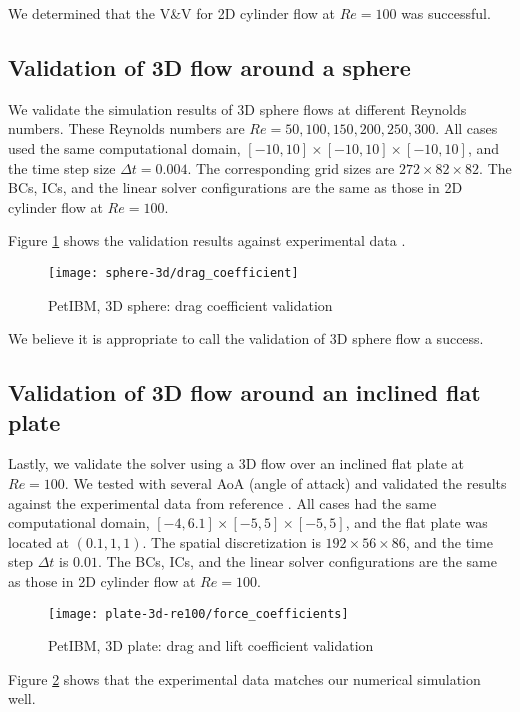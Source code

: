 We determined that the V\&V for 2D cylinder flow at $Re=100$ was successful.

\subsection*{Validation of 3D flow around a sphere}

We validate the simulation results of 3D sphere flows at different Reynolds numbers.
These Reynolds numbers are $Re=50, 100, 150, 200, 250, 300$.
All cases used the same computational domain, $[-10, 10] \times [-10, 10] \times [-10, 10]$, and the time step size $\Delta t=0.004$.
The corresponding grid sizes are $272 \times 82 \times 82$.
The BCs, ICs, and the linear solver configurations are the same as those in 2D cylinder flow at $Re=100$.

Figure \ref{fig:petibm-sphere3d-drag-val} shows the validation results against experimental data \cite{clift_bubbles_2013,roos_experimental_1971}.
\begin{figure}[hbt!]
    \texttt{[image: sphere-3d/drag\_coefficient]}
    \caption[PetIBM, 3D sphere: drag coefficient validation]{
        PetIBM, 3D sphere: drag coefficient validation \cite{clift_bubbles_2013,roos_experimental_1971}
    }
    \label{fig:petibm-sphere3d-drag-val}
\end{figure}
We believe it is appropriate to call the validation of 3D sphere flow a success.

\subsection*{Validation of 3D flow around an inclined flat plate}

Lastly, we validate the solver using a 3D flow over an inclined flat plate at $Re=100$.
We tested with several AoA (angle of attack) and validated the results against the experimental data from reference \cite{taira_unsteadiness_2007}.
All cases had the same computational domain, $[-4, 6.1] \times [-5, 5] \times [-5, 5]$, and the flat plate was located at $(0.1, 1, 1)$.
The spatial discretization is $192 \times 56 \times 86$, and the time step $\Delta t$ is $0.01$.
The BCs, ICs, and the linear solver configurations are the same as those in 2D cylinder flow at $Re=100$.

\begin{figure}[hbt!]
    \texttt{[image: plate-3d-re100/force\_coefficients]}
    \caption{PetIBM, 3D plate: drag and lift coefficient validation}
    \label{fig:petibm-plate3d-drag-lift-val}
\end{figure}
Figure \ref{fig:petibm-plate3d-drag-lift-val} shows that the experimental data matches our numerical simulation well.

